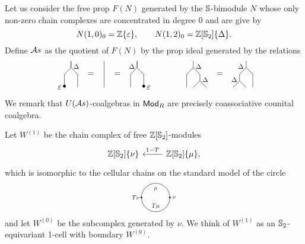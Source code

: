 Let us consider the free prop $F(N)$ generated by the $\S$-bimodule $N$ whose only non-zero chain complexes are concentrated in degree $0$ and are give by
\begin{equation*}
N(1, 0)_0 = \Z\{\varepsilon\}, \qquad
N(1, 2)_0 = \Z[\S_2]\{\Delta\}.
\end{equation*}
Define $\A$ as the quotient of $F(N)$ by the prop ideal generated by the relations
\begin{equation*}
\begin{tikzpicture}[scale=.28]
\draw (-4,0)--(-4,2)--(-5,3)--(-5,4);
\draw (-6,0)--(-6,2)--(-5,3)--(-5,4);
\node [scale=.8] at (-4.2,3.2) {$\Delta$};
\draw [fill] (-6,.2) circle [radius=.2];
\node [left] at (-6,0) {$\varepsilon$};

\node at (-2,2) {=};
\draw (0,0)--(0,4);
\node at (2,2) {=};

\draw (4,0)--(4,2)--(5,3)--(5,4);
\draw (6,0)--(6,2)--(5,3)--(5,4);
\node [scale=.8] at (4.2,3.2) {$\Delta$};
\draw [fill] (6,.2) circle [radius=.2];
\node [right] at (6,0) {$\varepsilon$};
\end{tikzpicture}
\qquad \qquad
\begin{tikzpicture}[scale=.28]
\node at (0,2){=};
\node at (0,0) {\phantom{$\varepsilon$}};

\draw (2,0)--(3,1)--(3,2)--(4,3)--(4,4);
\draw (4,0)--(3,1);
\draw (4,3)--(5,2)--(5,0);
\node [scale=.8] at (3.2,3.2) {$\Delta$};
\node [scale=.8] at (2.2,1.2) {$\Delta$};

\draw (-2,0)--(-3,1)--(-3,2)--(-4,3)--(-4,4);
\draw (-4,0)--(-3,1);
\draw (-4,3)--(-5,2)--(-5,0);
\node [scale=.8] at (-3.2,3.2) {$\Delta$};
\node [scale=.8] at (-2.2,1.2) {$\Delta$};
\end{tikzpicture}
\end{equation*}
We remark that $U(\A)$-coalgebras in $\Ch$ are precisely coassociative counital coalgebra.

Let $W^{(1)}$ be the chain complex of free $\Z[\S_2]$-modules
\begin{equation*}
\begin{tikzcd}
\Z[\S_2]\{\nu\} &[0pt] \arrow[l, "1-T"'] \Z[\S_2]\{\mu\},
\end{tikzcd} 
\end{equation*}
which is isomorphic to the cellular chains on the standard model of the circle
\begin{equation*}
\begin{tikzpicture}[scale=.85]
\draw (0,0) circle (20pt);
\node[scale=.7] at (0,12pt){$\mu$};
\node[scale=.7] at (0,-12pt){$T \mu$};
\node[scale=.7] at (-28pt,0){$T \nu$};
\node[scale=.7] at (26pt,0){$\nu$};
\draw [fill] (-20pt,0) circle [radius=1pt];
\draw [fill] (20pt,0) circle [radius=1pt];
\end{tikzpicture}
\end{equation*}
and let $W^{(0)}$ be the subcomplex generated by $\nu$. We think of $W^{(1)}$ as an $\S_2$-equivariant 1-cell with boundary $W^{(0)}$.

